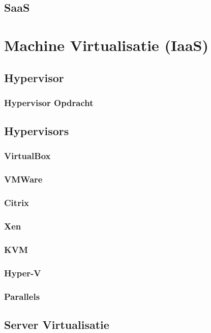 \documentclass[a4paper,12pt,twoside,openright,titlepage]{book}
\begin{document}
\section{SaaS}


\chapter{Machine Virtualisatie (IaaS)}

\section{Hypervisor}

\subsection{Hypervisor Opdracht}

\section{Hypervisors}
\subsection{VirtualBox}
\subsection{VMWare}
\subsection{Citrix}
\subsection{Xen}
\subsection{KVM}
\subsection{Hyper-V}
\subsection{Parallels}
\section{Server Virtualisatie}
\end{document}
